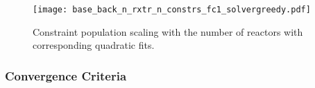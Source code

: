 \begin{figure}[h!]
  \begin{center}
    \texttt{[image: base\_back\_n\_rxtr\_n\_constrs\_fc1\_solvergreedy.pdf]}
    \caption[]{
      \label{fig:base_back_n_rxtr_n_constrs_fc1_solvergreedy}
      Constraint population scaling with the number of reactors with
      corresponding quadratic fits.}
  \end{center}
\end{figure}





\subsubsection{Convergence Criteria}
